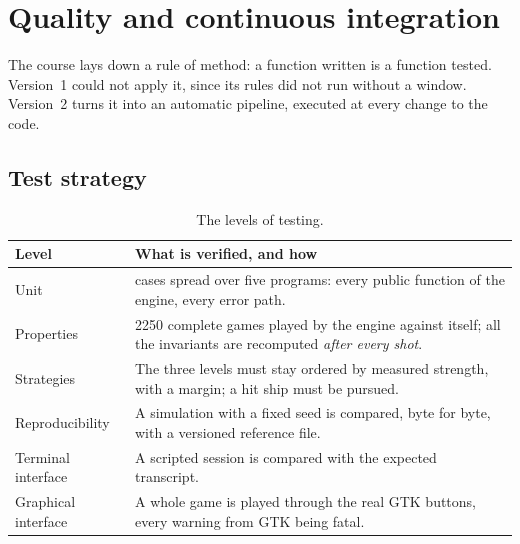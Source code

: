 \chapter{Quality and continuous integration}
\label{chap-qualite}

The course lays down a rule of method: a function written is a function tested. Version~1
could not apply it, since its rules did not run without a window. Version~2 turns it into an
automatic pipeline, executed at every change to the code.

\section{Test strategy}

\begin{table}[ht]
    \centering
    \small
    \begin{tabularx}{\textwidth}{@{}l>{\raggedright\arraybackslash}X@{}}
        \toprule
        \textbf{Level}      & \textbf{What is verified, and how}                                       \\
        \midrule
        Unit                & 54 cases spread over five programs: every public function of the engine,
        every error path.                                                                              \\
        \addlinespace
        Properties          & \num{2250} complete games played by the engine against itself; all the
        invariants are recomputed \emph{after every shot}.                                             \\
        \addlinespace
        Strategies          & The three levels must stay ordered by measured strength, with a margin;
        a hit ship must be pursued.                                                                    \\
        \addlinespace
        Reproducibility     & A simulation with a fixed seed is compared, byte for byte, with a
        versioned reference file.                                                                      \\
        \addlinespace
        Terminal interface  & A scripted session is compared with the expected transcript.             \\
        \addlinespace
        Graphical interface & A whole game is played through the real GTK buttons, every warning from
        GTK being fatal.                                                                               \\
        \bottomrule
    \end{tabularx}
    \caption{The levels of testing.}
    \label{tab-tests}
\end{table}

